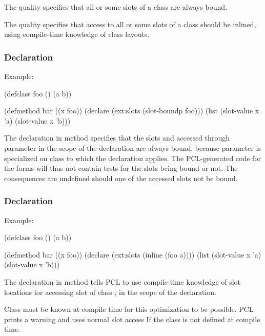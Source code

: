 The  quality specifies that all or some slots of a
class are always bound.

The  quality specifies that access to all or some slots
of a class should be inlined, using compile-time knowledge of class
layouts.



\subsubsection{ Declaration}

Example:

\begin{example}
(defclass foo ()
  (a b))

(defmethod bar ((x foo))
  (declare (ext:slots (slot-boundp foo)))
  (list (slot-value x 'a) (slot-value x 'b)))
\end{example}

The  declaration in method  specifies that
the slots  and  accessed through parameter  in
the scope of the declaration are always bound, because parameter
 is specialized on class  to which the
 declaration applies.  The PCL-generated code for
the  forms will thus not contain tests for the slots
being bound or not.  The consequences are undefined should one of the
accessed slots not be bound.



\subsubsection{ Declaration}

Example:

\begin{example}
(defclass foo ()
  (a b))

(defmethod bar ((x foo))
  (declare (ext:slots (inline (foo a))))
  (list (slot-value x 'a) (slot-value x 'b)))
\end{example}

The  declaration in method  tells PCL to use
compile-time knowledge of slot locations for accessing slot 
of class , in the scope of the declaration.

Class  must be known at compile time for this optimization
to be possible.  PCL prints a warning and uses normal slot access If
the class is not defined at compile time.

